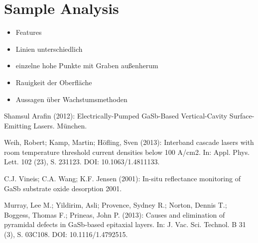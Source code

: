 \documentclass[paper=a4,fontsize=10pt,DIV=18,twocolumn,parskip=half]{scrartcl}
\numberwithin{equation}{section}    %
\begin{document}
\section{Sample Analysis}

\begin{itemize}
\item Features\\
\item Linien unterschiedlich\\

\item einzelne hohe Punkte mit Graben außenherum\\

\item Rauigkeit der Oberfläche\\
\item Aussagen über Wachstumsmethoden\\
\end{itemize}

\begin{thebibliography}{}   

 Shamsul Arafin (2012): Electrically-Pumped GaSb-Based 
Vertical-Cavity Surface-Emitting Lasers. München.

 Weih, Robert; Kamp, Martin; Höfling, Sven (2013): Interband 
cascade lasers with room temperature threshold current densities below 100 
A/cm2. In: Appl. Phys. Lett. 102 (23), S. 231123. DOI: 10.1063/1.4811133.

 C.J. Vineis; C.A. Wang; K.F. Jensen (2001): In-situ reflectance 
monitoring of GaSb substrate oxide desorption 2001.

 Murray, Lee M.; Yildirim, Asli; Provence, Sydney R.; Norton, 
Dennis T.; Boggess, Thomas F.; Prineas, John P. (2013): Causes and elimination 
of pyramidal defects in GaSb-based epitaxial layers. In: J. Vac. Sci. Technol. B 
31 (3), S. 03C108. DOI: 10.1116/1.4792515.
  

\end{thebibliography}
%
%
\onecolumn
\pagestyle{empty}
\end{document}
